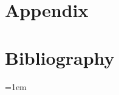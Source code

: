 \documentclass[ twoside=semi,openright,titlepage,numbers=noenddot,%
                headinclude,footinclude,cleardoublepage=plain,abstract=on,
                BCOR=5mm,paper=letter,fontsize=10.25pt%
                ]{scrreprt}
\begin{document}
\part{Appendix}

\part*{Bibliography}
\emergencystretch=1em
\cleardoublepage
\end{document}
